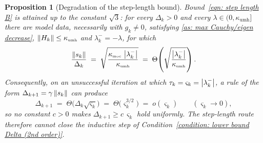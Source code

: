 \documentclass[11pt]{article}
\theoremstyle{plain}
\newtheorem{proposition}[theorem]{Proposition}
\theoremstyle{definition}
\theoremstyle{remark}
\numberwithin{equation}{section}
\newcommand*\mykappa[1]{\kappa_{\scriptscriptstyle\text{#1}}}
\begin{document}
\begin{proposition}[Degradation of the step-length bound]
\label{prop: degradation}
    Bound~\eqref{eqn: step length B} is attained up to the constant $\sqrt3$: for every
    $\Delta_k > 0$ and every $\lambda \in (0, \mykappa{umh}]$ there are model data, necessarily
    with $g_k \neq 0$, satisfying \ref{as: max Cauchy/eigen decrease},
    $\norm{H_k} \leq \mykappa{umh}$ and $\lambda_k^- = -\lambda$, for which
    \begin{equation}
        \frac{\norm{s_k}}{\Delta_k}
          \;=\; \sqrt{\frac{\mykappa{moc}\,\abs{\lambda_k^-}}{\mykappa{umh}}}
          \;=\; \Theta\!\left(\sqrt{\frac{\abs{\lambda_k^-}}{\mykappa{umh}}}\right) .
        \label{eqn: degradation ratio}
    \end{equation}
    Consequently, on an unsuccessful iteration at which $\tau_k = \varsigma_k = \left \vert \lambda_k^- \right \vert$,
    a rule of the form $\Delta_{k+1} = \gamma\left \lVert s_k \right \rVert$ can produce
    \begin{equation}
        \Delta_{k+1} \;=\; \Theta\bigl(\Delta_k\sqrt{\varsigma_k}\bigr)
                     \;=\; \Theta\bigl(\varsigma_k^{3/2}\bigr)
                     \;=\; o(\varsigma_k)
        \qquad (\varsigma_k \to 0) ,
        \label{eqn: degradation consequence}
    \end{equation}
    so no constant $c > 0$ makes $\Delta_{k+1} \geq c\,\varsigma_k$ hold uniformly. The step-length
    route therefore cannot close the inductive step of
    Condition~\ref{condition: lower bound Delta (2nd order)}.
\end{proposition}
\end{document}
